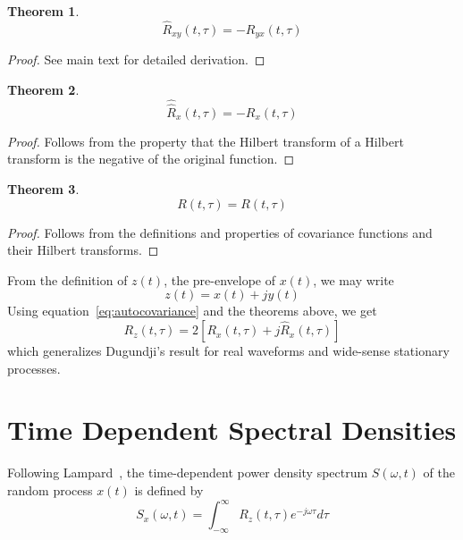 \documentclass[12pt]{article}
\newtheorem{theorem}{Theorem}[section]
\begin{document}
\begin{theorem}
\label{thm:hilbert_cross}
\begin{equation}
\hat{R}_{xy}(t, \tau) = -R_{yx}(t, \tau)
\label{eq:hilbert_cross}
\end{equation}
\end{theorem}
\begin{proof}
See main text for detailed derivation.
\end{proof}

\begin{theorem}
\label{thm:hilbert_of_hilbert}
\begin{equation}
\hat{\hat{R}}_x(t, \tau) = -R_x(t, \tau)
\label{eq:hilbert_of_hilbert}
\end{equation}
\end{theorem}
\begin{proof}
Follows from the property that the Hilbert transform of a Hilbert transform is the negative of the original function.
\end{proof}

\begin{theorem}
\label{thm:covariance_identity}
\begin{equation}
R(t, \tau) = R(t, \tau)
\label{eq:covariance_identity}
\end{equation}
\end{theorem}
\begin{proof}
Follows from the definitions and properties of covariance functions and their Hilbert transforms.
\end{proof}

From the definition of $z(t)$, the pre-envelope of $x(t)$, we may write
\begin{equation}
z(t) = x(t) + jy(t)
\label{eq:preenvelope}
\end{equation}
Using equation~\eqref{eq:autocovariance} and the theorems above, we get
\begin{equation}
R_z(t, \tau) = 2\left[ R_x(t, \tau) + j \hat{R}_x(t, \tau) \right]
\label{eq:preenvelope_autocov}
\end{equation}
which generalizes Dugundji's result for real waveforms and wide-sense stationary processes.

\section{Time Dependent Spectral Densities}
Following Lampard~\cite{lampard1954}, the time-dependent power density spectrum $S(\omega, t)$ of the random process $x(t)$ is defined by
\begin{equation}
S_x(\omega, t) = \int_{-\infty}^{\infty} R_z(t, \tau) e^{-j\omega\tau} d\tau
\label{eq:tdspectrum}
\end{equation}
\end{document}

